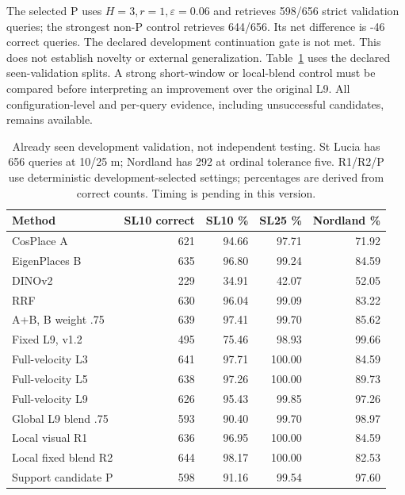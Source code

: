 \documentclass[conference]{IEEEtran}
\begin{document}
The selected P uses $H=3,r=1,\varepsilon=0.06$ and retrieves 598/656 strict validation queries; the strongest non-P control retrieves 644/656. Its net difference is -46 correct queries. The declared development continuation gate is not met. This does not establish novelty or external generalization. Table~\ref{tab:main} uses the declared seen-validation splits. A strong short-window or local-blend control must be compared before interpreting an improvement over the original L9. All configuration-level and per-query evidence, including unsuccessful candidates, remains available.

\begin{table}[t]\centering\small
\caption{Already seen development validation, not independent testing. St Lucia has 656 queries at 10/25 m; Nordland has 292 at ordinal tolerance five. R1/R2/P use deterministic development-selected settings; percentages are derived from correct counts. Timing is pending in this version.}\label{tab:main}
\begin{tabular}{lrrrr}\toprule
Method & SL10 correct & SL10 \% & SL25 \% & Nordland \% \\\midrule
CosPlace A & 621 & 94.66 & 97.71 & 71.92\\
EigenPlaces B & 635 & 96.80 & 99.24 & 84.59\\
DINOv2 & 229 & 34.91 & 42.07 & 52.05\\
RRF & 630 & 96.04 & 99.09 & 83.22\\
A+B, B weight .75 & 639 & 97.41 & 99.70 & 85.62\\
Fixed L9, v1.2 & 495 & 75.46 & 98.93 & 99.66\\
Full-velocity L3 & 641 & 97.71 & 100.00 & 84.59\\
Full-velocity L5 & 638 & 97.26 & 100.00 & 89.73\\
Full-velocity L9 & 626 & 95.43 & 99.85 & 97.26\\
Global L9 blend .75 & 593 & 90.40 & 99.70 & 98.97\\
Local visual R1 & 636 & 96.95 & 100.00 & 84.59\\
Local fixed blend R2 & 644 & 98.17 & 100.00 & 82.53\\
Support candidate P & 598 & 91.16 & 99.54 & 97.60\\
\bottomrule\end{tabular}\end{table}
\end{document}
